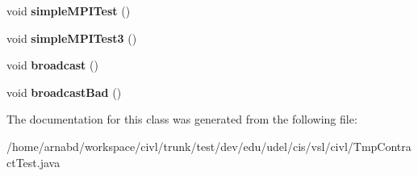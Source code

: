 \begin{DoxyCompactItemize}
\item 
\hypertarget{classedu_1_1udel_1_1cis_1_1vsl_1_1civl_1_1TmpContractTest_a3683a39d4ac211ff97435b2c8426fe0b}{}void {\bfseries simple\+M\+P\+I\+Test} ()\label{classedu_1_1udel_1_1cis_1_1vsl_1_1civl_1_1TmpContractTest_a3683a39d4ac211ff97435b2c8426fe0b}

\item 
\hypertarget{classedu_1_1udel_1_1cis_1_1vsl_1_1civl_1_1TmpContractTest_aa7c5d8b9167e7ab7212e99fc6ed73f47}{}void {\bfseries simple\+M\+P\+I\+Test3} ()\label{classedu_1_1udel_1_1cis_1_1vsl_1_1civl_1_1TmpContractTest_aa7c5d8b9167e7ab7212e99fc6ed73f47}

\item 
\hypertarget{classedu_1_1udel_1_1cis_1_1vsl_1_1civl_1_1TmpContractTest_ab7901998b9f4b17de0697178811b4b7e}{}void {\bfseries broadcast} ()\label{classedu_1_1udel_1_1cis_1_1vsl_1_1civl_1_1TmpContractTest_ab7901998b9f4b17de0697178811b4b7e}

\item 
\hypertarget{classedu_1_1udel_1_1cis_1_1vsl_1_1civl_1_1TmpContractTest_a8fd828eb58826d0dcf354c58194c2a8b}{}void {\bfseries broadcast\+Bad} ()\label{classedu_1_1udel_1_1cis_1_1vsl_1_1civl_1_1TmpContractTest_a8fd828eb58826d0dcf354c58194c2a8b}

\end{DoxyCompactItemize}


The documentation for this class was generated from the following file\+:\begin{DoxyCompactItemize}
\item 
/home/arnabd/workspace/civl/trunk/test/dev/edu/udel/cis/vsl/civl/Tmp\+Contract\+Test.\+java\end{DoxyCompactItemize}

